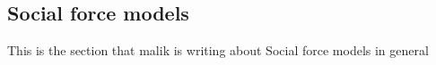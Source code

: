 \subsection{Social force models}
This is the section that malik is writing about Social force models in general